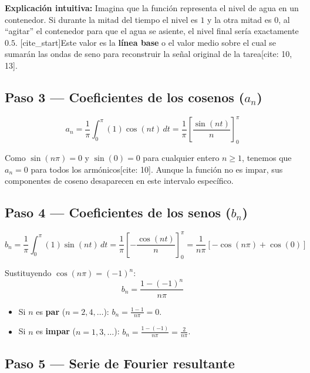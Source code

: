\documentclass[
  letterpaper,
  DIV=11,
  numbers=noendperiod]{scrreprt}
\providecommand{\tightlist}{%
  \setlength{\itemsep}{0pt}\setlength{\parskip}{0pt}}
\begin{document}
\textbf{Explicación intuitiva:} Imagina que la función representa el
nivel de agua en un contenedor. Si durante la mitad del tiempo el nivel
es \(1\) y la otra mitad es \(0\), al ``agitar'' el contenedor para que
el agua se asiente, el nivel final sería exactamente \(0.5\).
{[}cite\_start{]}Este valor es la \textbf{línea base} o el valor medio
sobre el cual se sumarán las ondas de seno para reconstruir la señal
original de la tarea{[}cite: 10, 13{]}.

\subsection{\texorpdfstring{Paso 3 --- Coeficientes de los cosenos
(\(a_n\))}{Paso 3 --- Coeficientes de los cosenos (a\_n)}}\label{paso-3-coeficientes-de-los-cosenos-a_n-1}

\[
a_n = \frac{1}{\pi}\int_0^{\pi} (1)\cos(nt)\,dt = \frac{1}{\pi} \left[ \frac{\sin(nt)}{n} \right]_0^{\pi}
\]

Como \(\sin(n\pi) = 0\) y \(\sin(0) = 0\) para cualquier entero
\(n \ge 1\), tenemos que \textbf{\(a_n = 0\)} para todos los
armónicos{[}cite: 10{]}. Aunque la función no es impar, sus componentes
de coseno desaparecen en este intervalo específico.

\subsection{\texorpdfstring{Paso 4 --- Coeficientes de los senos
(\(b_n\))}{Paso 4 --- Coeficientes de los senos (b\_n)}}\label{paso-4-coeficientes-de-los-senos-b_n}

\[
b_n = \frac{1}{\pi}\int_0^{\pi} (1)\sin(nt)\,dt = \frac{1}{\pi} \left[ -\frac{\cos(nt)}{n} \right]_0^{\pi} = \frac{1}{n\pi} [-\cos(n\pi) + \cos(0)]
\]

Sustituyendo \(\cos(n\pi) = (-1)^n\): \[b_n = \frac{1 - (-1)^n}{n\pi}\]

\begin{itemize}
\tightlist
\item
  Si \(n\) es \textbf{par} (\(n=2, 4, \dots\)):
  \(b_n = \frac{1 - 1}{n\pi} = 0\).
\item
  Si \(n\) es \textbf{impar} (\(n=1, 3, \dots\)):
  \(b_n = \frac{1 - (-1)}{n\pi} = \frac{2}{n\pi}\).
\end{itemize}

\subsection{Paso 5 --- Serie de Fourier
resultante}\label{paso-5-serie-de-fourier-resultante}
\end{document}
